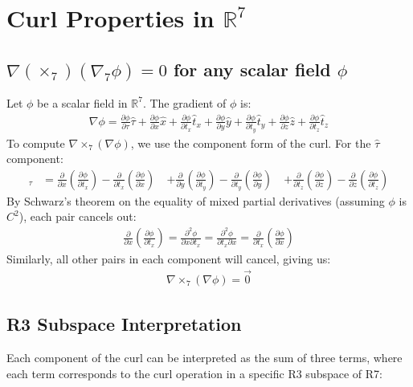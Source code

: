 \documentclass{article}
\begin{document}
\section*{Curl Properties in $\mathbb{R}^7$}
\subsection*{$\nabla (\times_7) (\nabla_7 \phi) = 0$ for any scalar field $\phi$}
Let $\phi$ be a scalar field in $\mathbb{R}^7$. The gradient of $\phi$ is:
\begin{align*}
\nabla \phi = \frac{\partial \phi}{\partial \tau}\hat{\tau} + \frac{\partial \phi}{\partial x}\hat{x} + \frac{\partial \phi}{\partial t_x}\hat{t}_x + \frac{\partial \phi}{\partial y}\hat{y} + \frac{\partial \phi}{\partial t_y}\hat{t}_y + \frac{\partial \phi}{\partial z}\hat{z} + \frac{\partial \phi}{\partial t_z}\hat{t}_z
\end{align*}
To compute $\nabla \times_7 (\nabla \phi)$, we use the component form of the curl. For the $\hat{\tau}$ component:
\begin{align*}
[\nabla \times_7 (\nabla \phi)]_\tau &= \frac{\partial}{\partial x}\left(\frac{\partial \phi}{\partial t_x}\right) - \frac{\partial}{\partial t_x}\left(\frac{\partial \phi}{\partial x}\right) \
&+ \frac{\partial}{\partial y}\left(\frac{\partial \phi}{\partial t_y}\right) - \frac{\partial}{\partial t_y}\left(\frac{\partial \phi}{\partial y}\right) \
&+ \frac{\partial}{\partial t_z}\left(\frac{\partial \phi}{\partial z}\right) - \frac{\partial}{\partial z}\left(\frac{\partial \phi}{\partial t_z}\right)
\end{align*}
By Schwarz's theorem on the equality of mixed partial derivatives (assuming $\phi$ is $C^2$), each pair cancels out:
\begin{align*}
\frac{\partial}{\partial x}\left(\frac{\partial \phi}{\partial t_x}\right) = \frac{\partial^2 \phi}{\partial x \partial t_x} = \frac{\partial^2 \phi}{\partial t_x \partial x} = \frac{\partial}{\partial t_x}\left(\frac{\partial \phi}{\partial x}\right)
\end{align*}
Similarly, all other pairs in each component will cancel, giving us:
\begin{align*}
\nabla \times_7 (\nabla \phi) = \vec{0}
\end{align*}

\subsection{R3 Subspace Interpretation}
Each component of the curl can be interpreted as the sum of three terms, where each term corresponds to the curl operation in a specific R3 subspace of R7:
\end{document}
